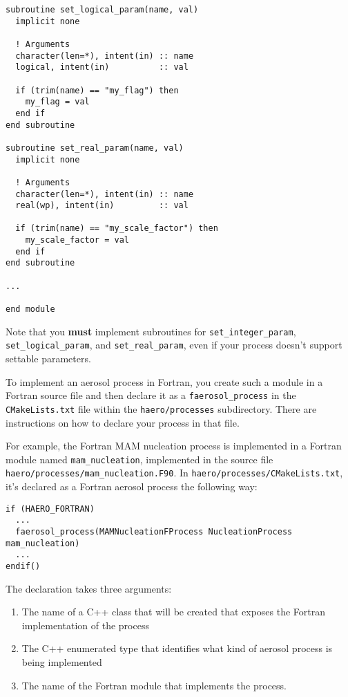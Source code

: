 \begin{lstlisting}
subroutine set_logical_param(name, val)
  implicit none

  ! Arguments
  character(len=*), intent(in) :: name
  logical, intent(in)          :: val

  if (trim(name) == "my_flag") then
    my_flag = val
  end if
end subroutine

subroutine set_real_param(name, val)
  implicit none

  ! Arguments
  character(len=*), intent(in) :: name
  real(wp), intent(in)         :: val

  if (trim(name) == "my_scale_factor") then
    my_scale_factor = val
  end if
end subroutine

...

end module
\end{lstlisting}

Note that you {\bf must} implement subroutines for \texttt{set\_integer\_param},
\texttt{set\_logical\_param}, and \texttt{set\_real\_param}, even if your process
doesn't support settable parameters.

To implement an aerosol process in Fortran, you create such a module in a
Fortran source file and then declare it as a \texttt{faerosol\_process} in the
\texttt{CMakeLists.txt} file within the \texttt{haero/processes} subdirectory.
There are instructions on how to declare your process in that file.

For example, the Fortran MAM nucleation process is implemented in a Fortran
module named \texttt{mam\_nucleation}, implemented in the source file
\texttt{haero/processes/mam\_nucleation.F90}. In
\texttt{haero/processes/CMakeLists.txt}, it's declared as a Fortran aerosol
process the following way:

\begin{lstlisting}
if (HAERO_FORTRAN)
  ...
  faerosol_process(MAMNucleationFProcess NucleationProcess mam_nucleation)
  ...
endif()
\end{lstlisting}

The declaration takes three arguments:

\begin{enumerate}
  \item The name of a C++ class that will be created that exposes the Fortran
        implementation of the process
  \item The C++ enumerated type that identifies what kind of aerosol process
        is being implemented
  \item The name of the Fortran module that implements the process.
\end{enumerate}

